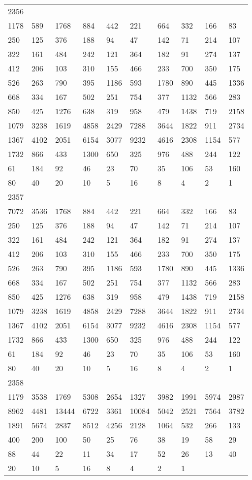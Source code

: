 \begin{longtable}{*{10}{l}}
2356&&&&&&&&&\\
1178& 589& 1768& 884& 442& 221& 664& 332& 166& 83\\
250& 125& 376& 188& 94& 47& 142& 71& 214& 107\\
322& 161& 484& 242& 121& 364& 182& 91& 274& 137\\
412& 206& 103& 310& 155& 466& 233& 700& 350& 175\\
526& 263& 790& 395& 1186& 593& 1780& 890& 445& 1336\\
668& 334& 167& 502& 251& 754& 377& 1132& 566& 283\\
850& 425& 1276& 638& 319& 958& 479& 1438& 719& 2158\\
1079& 3238& 1619& 4858& 2429& 7288& 3644& 1822& 911& 2734\\
1367& 4102& 2051& 6154& 3077& 9232& 4616& 2308& 1154& 577\\
1732& 866& 433& 1300& 650& 325& 976& 488& 244& 122\\
61& 184& 92& 46& 23& 70& 35& 106& 53& 160\\
80& 40& 20& 10& 5& 16& 8& 4& 2& 1\\

2357&&&&&&&&&\\
7072& 3536& 1768& 884& 442& 221& 664& 332& 166& 83\\
250& 125& 376& 188& 94& 47& 142& 71& 214& 107\\
322& 161& 484& 242& 121& 364& 182& 91& 274& 137\\
412& 206& 103& 310& 155& 466& 233& 700& 350& 175\\
526& 263& 790& 395& 1186& 593& 1780& 890& 445& 1336\\
668& 334& 167& 502& 251& 754& 377& 1132& 566& 283\\
850& 425& 1276& 638& 319& 958& 479& 1438& 719& 2158\\
1079& 3238& 1619& 4858& 2429& 7288& 3644& 1822& 911& 2734\\
1367& 4102& 2051& 6154& 3077& 9232& 4616& 2308& 1154& 577\\
1732& 866& 433& 1300& 650& 325& 976& 488& 244& 122\\
61& 184& 92& 46& 23& 70& 35& 106& 53& 160\\
80& 40& 20& 10& 5& 16& 8& 4& 2& 1\\

2358&&&&&&&&&\\
1179& 3538& 1769& 5308& 2654& 1327& 3982& 1991& 5974& 2987\\
8962& 4481& 13444& 6722& 3361& 10084& 5042& 2521& 7564& 3782\\
1891& 5674& 2837& 8512& 4256& 2128& 1064& 532& 266& 133\\
400& 200& 100& 50& 25& 76& 38& 19& 58& 29\\
88& 44& 22& 11& 34& 17& 52& 26& 13& 40\\
20& 10& 5& 16& 8& 4& 2& 1& \\


\end{longtable}
